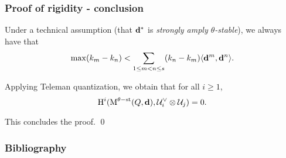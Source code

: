 \documentclass{beamer}
\begin{document}
\begin{frame}
    \frametitle{Proof of rigidity - conclusion}
Under a technical assumption (that $\mathbf{d}^*$ is \emph{strongly amply $\theta$-stable}),
we always have that
\[\max(k_m - k_n) < \sum_{1 \leq m < n \leq s} (k_n - k_m)\langle \mathbf{d}^m, \mathbf{d}^n \rangle.\] \pause

Applying Teleman quantization, we obtain that for all $i \geq 1$,
\[ \operatorname{H}^i(\operatorname{M}^{\theta-\mathrm{st}}(Q, \mathbf{d}), \mathcal{U}^{\vee}_i \otimes \mathcal{U}_j) = 0. \]

This concludes the proof. \qed
\end{frame}

\begin{frame}
    \frametitle{Bibliography}
    \printbibliography
\end{frame}
\end{document}
